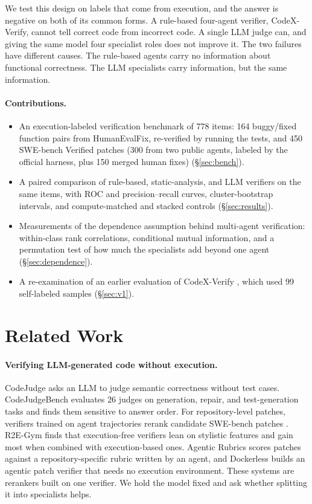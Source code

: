 We test this design on labels that come from execution, and the answer is negative on both of its common forms. A rule-based four-agent verifier, CodeX-Verify, cannot tell correct code from incorrect code. A single LLM judge can, and giving the same model four specialist roles does not improve it. The two failures have different causes. The rule-based agents carry no information about functional correctness. The LLM specialists carry information, but the same information.

\paragraph{Contributions.}
\begin{itemize}
\item An execution-labeled verification benchmark of 778 items: 164 buggy/fixed function pairs from HumanEvalFix, re-verified by running the tests, and 450 SWE-bench Verified patches (300 from two public agents, labeled by the official harness, plus 150 merged human fixes) (\S\ref{sec:bench}).
\item A paired comparison of rule-based, static-analysis, and LLM verifiers on the same items, with ROC and precision--recall curves, cluster-bootstrap intervals, and compute-matched and stacked controls (\S\ref{sec:results}).
\item Measurements of the dependence assumption behind multi-agent verification: within-class rank correlations, conditional mutual information, and a permutation test of how much the specialists add beyond one agent (\S\ref{sec:dependence}).
\item A re-examination of an earlier evaluation of CodeX-Verify \citep{rajan2025codexverify}, which used 99 self-labeled samples (\S\ref{sec:v1}).
\end{itemize}

\section{Related Work}

\paragraph{Verifying LLM-generated code without execution.}
CodeJudge \citep{codejudge2024} asks an LLM to judge semantic correctness without test cases. CodeJudgeBench \citep{codejudgebench2025} evaluates 26 judges on generation, repair, and test-generation tasks and finds them sensitive to answer order. For repository-level patches, verifiers trained on agent trajectories rerank candidate SWE-bench patches \citep{swegym2024}. R2E-Gym \citep{r2egym2025} finds that execution-free verifiers lean on stylistic features and gain most when combined with execution-based ones. Agentic Rubrics \citep{agenticrubrics2026} scores patches against a repository-specific rubric written by an agent, and Dockerless \citep{dockerless2026} builds an agentic patch verifier that needs no execution environment. These systems are rerankers built on one verifier. We hold the model fixed and ask whether splitting it into specialists helps.

